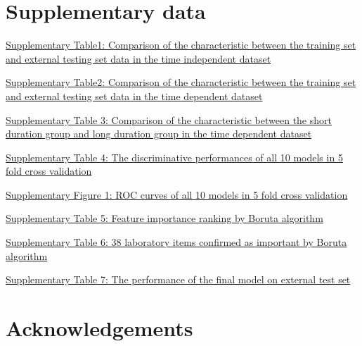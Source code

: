 \documentclass[final,1p,times,authoryear]{elsarticle}
\begin{document}
\appendix
\section{Supplementary data}\label{sec:supplementary}

\href{run:supplementary/latex_data_description_table_train_test_origi.csv}{Supplementary Table1: Comparison of the characteristic between the training set and external testing set data in the time independent dataset}
\label{tab:train_test_origi}

\href{run:supplementary/latex_data_description_table_train_test_time.cdv}{Supplementary Table2: Comparison of the characteristic between the training set and external testing set data in the time dependent dataset}
\label{tab:train_test_time}

\href{run:supplementary/latex_data_description_table_outcome_time.csv}{Supplementary Table 3: Comparison of the characteristic between the short duration group and long duration group in the time dependent dataset}
\label{tab:good_outcome_poor_outcome_time}


\href{run:supplementary/kfolint_results.csv}{Supplementary Table 4: The discriminative performances of all 10 models in 5 fold cross validation}
\label{tab:kfold_results}

\href{run:supplementary/koldall.png}{Supplementary Figure 1: ROC curves of all 10 models in 5 fold cross validation}
\label{fig:kfold_all}

\href{run:supplementary/ranking_df.csv}{Supplementary Table 5: Feature importance ranking by Boruta algorithm}
\label{tab:boruta_ranking_df}

\href{run:supplementary/top38_confirmed_vars.csv}{Supplementary Table 6: 38 laboratory items confirmed as important by Boruta algorithm}
\label{tab:boruta_confirmed_vars}

\href{run:supplementary/extval_result.csv}{Supplementary Table 7: The performance of the final model on external test set}
\label{tab:extval_result}


\section{Acknowledgements}\label{Acknowledgements}


 


 
\end{document}
